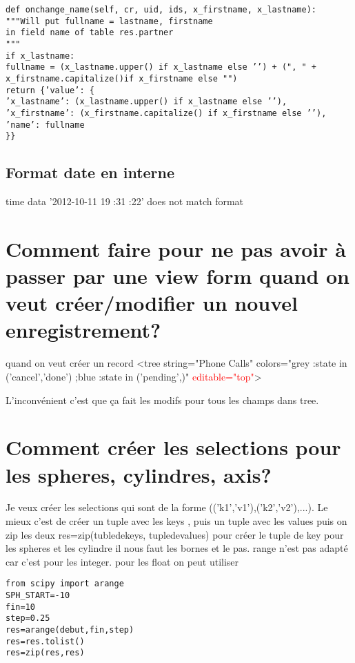 \documentclass[12pt,a4paper]{article}
\begin{document}
\begin{verbatim}
def onchange_name(self, cr, uid, ids, x_firstname, x_lastname):
"""Will put fullname = lastname, firstname
in field name of table res.partner
"""
if x_lastname:
fullname = (x_lastname.upper() if x_lastname else ’’) + (", " + x_firstname.capitalize()if x_firstname else "")
return {’value’: {
’x_lastname’: (x_lastname.upper() if x_lastname else ’’),
’x_firstname’: (x_firstname.capitalize() if x_firstname else ’’),
’name’: fullname
}}
\end{verbatim}


\subsection{Format date en interne}
\label{sec:interdateformat}


time data ’2012-10-11 19 :31 :22’ does not match format





\section{Comment faire pour ne pas avoir à passer par une view form quand on veut créer/modifier un nouvel enregistrement?}
\label{sec:editable}


quand on veut créer un record
<tree string="Phone Calls" colors="grey :state in (’cancel’,’done’) ;blue :state in (’pending’,)" \textcolor{red}{editable="top"}>

L'inconvénient c'est que ça fait les modifs pour tous les champs dans tree.

\section{Comment créer les selections pour les spheres, cylindres, axis?}
\label{sec:sel_sph}

Je veux créer les selections qui sont de la forme (('k1','v1'),('k2','v2'),...). 
Le mieux c'est de créer un tuple avec les keys , puis un tuple avec les values 
puis on zip les deux res=zip(tubledekeys, tupledevalues)
pour créer le tuple de key pour les spheres et les cylindre il nous faut les bornes et le pas. 
range n'est pas adapté car c'est pour les integer. 
pour les float on peut utiliser
\begin{verbatim}
from scipy import arange
SPH_START=-10
fin=10
step=0.25
res=arange(debut,fin,step)
res=res.tolist()
res=zip(res,res)

\end{verbatim}
\end{document}

